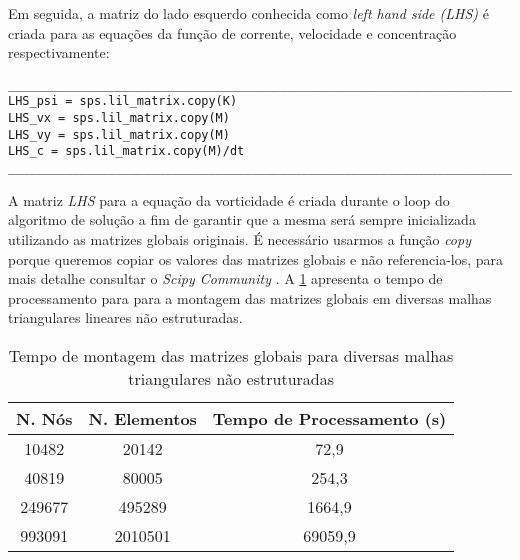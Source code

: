 \newpage
Em seguida, a matriz do lado esquerdo conhecida como 
\textit{left hand side (LHS)} é criada para as
equações da função de corrente,
velocidade e concentração respectivamente:

\begin{verbatim}
__________________________________________________________________________
LHS_psi = sps.lil_matrix.copy(K)
LHS_vx = sps.lil_matrix.copy(M)
LHS_vy = sps.lil_matrix.copy(M)
LHS_c = sps.lil_matrix.copy(M)/dt
__________________________________________________________________________
\end{verbatim}

A matriz \textit{LHS} para a equação da vorticidade
é criada durante o loop do algoritmo de solução
a fim de garantir que a mesma será sempre inicializada
utilizando as matrizes globais originais.
É necessário usarmos a função \textit{copy}
porque queremos copiar os valores das matrizes globais
e não referencia-los,
para mais detalhe consultar o \textit{Scipy Community} \cite{numpycopy}.
A \ref{tempo matrizes globais} apresenta o tempo de processamento para 
para a montagem das matrizes globais em diversas
malhas triangulares lineares não estruturadas.

\vspace{0.5cm}
\begin{table}[H]
\centering
\begin{tabular}{ccc}
\toprule
\textbf{N. Nós} & \textbf{N. Elementos} & \textbf{Tempo de Processamento} (s) \\
\midrule
10482 & 20142 & 72,9 \\
40819 & 80005 & 254,3 \\
249677 & 495289 & 1664,9 \\
993091 & 2010501 & 69059,9 \\

\bottomrule
\end{tabular}
\caption{Tempo de montagem das matrizes globais para diversas malhas triangulares não estruturadas}
\label{tempo matrizes globais}
\end{table}
                
